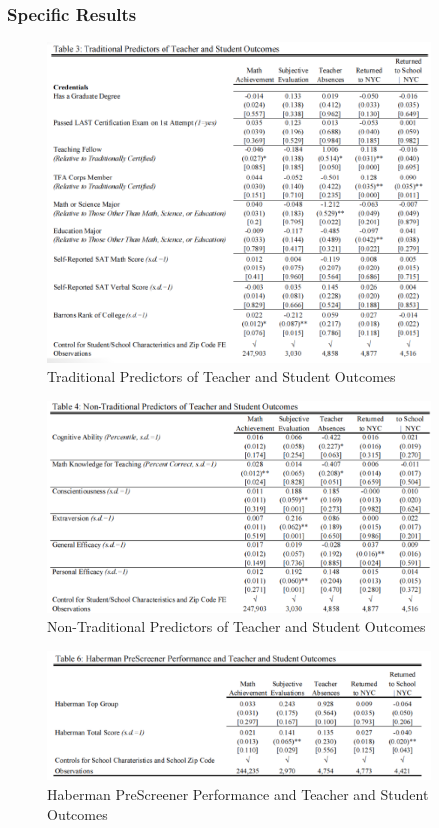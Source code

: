         \subsubsection{Specific Results}

            \begin{figure}[H]
                \centering
                \includegraphics[width=4in]{images/ch9/9 rockoff 1.png}
                \caption{Traditional Predictors of Teacher and Student Outcomes}
            \end{figure}
            \begin{figure}[H]
                \centering
                \includegraphics[width=4in]{images/ch9/9 rockoff 2.png}
                \caption{Non-Traditional Predictors of Teacher and Student Outcomes}
            \end{figure}
            \begin{figure}[H]
                \centering
                \includegraphics[width=4in]{images/ch9/9 rockoff 3.png}
                \caption{Haberman PreScreener Performance and Teacher and Student Outcomes}
            \end{figure}
